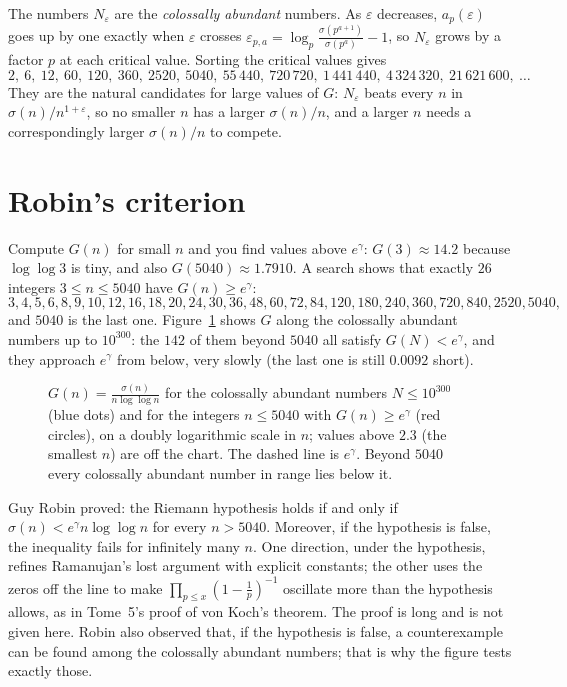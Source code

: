 The numbers $N_\varepsilon$ are the \emph{colossally abundant} numbers. As $\varepsilon$ decreases, $a_p(\varepsilon)$ goes up by one exactly when $\varepsilon$ crosses
$\varepsilon_{p,a}=\log_p\frac{\sigma(p^{a+1})}{\sigma(p^a)}-1$, so $N_\varepsilon$ grows by a factor $p$ at each critical value. Sorting the critical values gives
\[
2,\ 6,\ 12,\ 60,\ 120,\ 360,\ 2520,\ 5040,\ 55\,440,\ 720\,720,\ 1\,441\,440,\ 4\,324\,320,\ 21\,621\,600,\ \dots
\]
They are the natural candidates for large values of $G$: $N_\varepsilon$ beats every $n$ in $\sigma(n)/n^{1+\varepsilon}$, so no smaller $n$ has a larger $\sigma(n)/n$,
and a larger $n$ needs a correspondingly larger $\sigma(n)/n$ to compete.

\section{Robin's criterion}

Compute $G(n)$ for small $n$ and you find values above $e^\gamma$: $G(3)\approx14.2$ because $\log\log3$ is tiny, and also $G(5040)\approx1.7910$. A
search shows that exactly $26$ integers $3\le n\le5040$ have $G(n)\ge e^\gamma$:
\[
3,4,5,6,8,9,10,12,16,18,20,24,30,36,48,60,72,84,120,180,240,360,720,840,2520,5040,
\]
and $5040$ is the last one. Figure~\ref{conjectures:fig:robin} shows $G$ along the colossally abundant numbers up to $10^{300}$: the $142$ of them beyond $5040$ all
satisfy $G(N)<e^\gamma$, and they approach $e^\gamma$ from below, very slowly (the last one is still $0.0092$ short).

\begin{figure}[ht]
\centering
{}
\caption{$G(n)=\frac{\sigma(n)}{n\log\log n}$ for the colossally abundant numbers $N\le10^{300}$ (blue dots) and for the integers $n\le5040$ with $G(n)\ge e^\gamma$
(red circles), on a doubly logarithmic scale in $n$; values above $2.3$ (the smallest $n$) are off the chart. The dashed line is $e^\gamma$. Beyond
$5040$ every colossally abundant number in range lies below it.}
\label{conjectures:fig:robin}
\end{figure}

\begin{remark}[Robin, 1984]\label{conjectures:rem:robin}
Guy Robin proved: the Riemann hypothesis holds if and only if $\sigma(n)<e^\gamma n\log\log n$ for every $n>5040$. Moreover, if the hypothesis is false,
the inequality fails for infinitely many $n$. One direction, under the hypothesis, refines Ramanujan's lost argument with explicit constants; the other
uses the zeros off the line to make $\prod_{p\le x}(1-\frac1p)^{-1}$ oscillate more than the hypothesis allows, as in Tome~5's proof of von Koch's
theorem. The proof is long and is not given here. Robin also observed that, if the hypothesis is false, a counterexample can be found among the
colossally abundant numbers; that is why the figure tests exactly those.
\end{remark}

